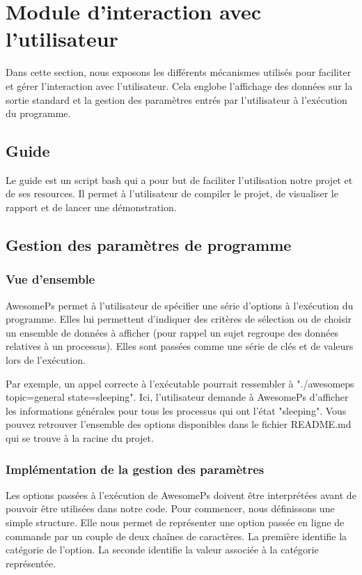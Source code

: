 \section{Module d'interaction avec l’utilisateur}
Dans cette section, nous exposons les différents mécanismes utilisés pour faciliter et gérer l’interaction avec l’utilisateur. Cela englobe l’affichage des données sur la sortie standard et la gestion des paramètres entrés par l’utilisateur à l’exécution du programme.

\subsection{Guide}
Le guide est un script bash qui a pour but de faciliter l'utilisation notre projet et de ses resources. Il permet à l'utilisateur de compiler le projet, de visualiser le rapport et de lancer une démonstration.

\subsection{Gestion des paramètres de programme}
\subsubsection{Vue d'ensemble}
AwesomePs permet à l'utilisateur de spécifier une série d'options à l'exécution du programme. Elles lui permettent d'indiquer des critères de sélection ou de choisir un ensemble de données à afficher (pour rappel un sujet regroupe des données relatives à un processus). Elles sont passées comme une série de clés et de valeurs lors de l'exécution.

Par exemple, un appel correcte à l'exécutable pourrait ressembler à "./awesomeps topic=general state=sleeping". Ici, l'utilisateur demande à AwesomePs d'afficher les informations générales pour tous les processus qui ont l'état "sleeping". Vous pouvez retrouver l'ensemble des options disponibles dans le fichier README.md qui se trouve à la racine du projet.

\subsubsection{Implémentation de la gestion des paramètres}
Les options passées à l'exécution de AwesomePs doivent être interprétées avant de pouvoir être utilisées dans notre code. Pour commencer, nous définissons une simple structure. Elle nous permet de représenter une option passée en ligne de commande par un couple de deux chaînes de caractères. La première identifie la catégorie de l'option. La seconde identifie la valeur associée à la catégorie représentée.


